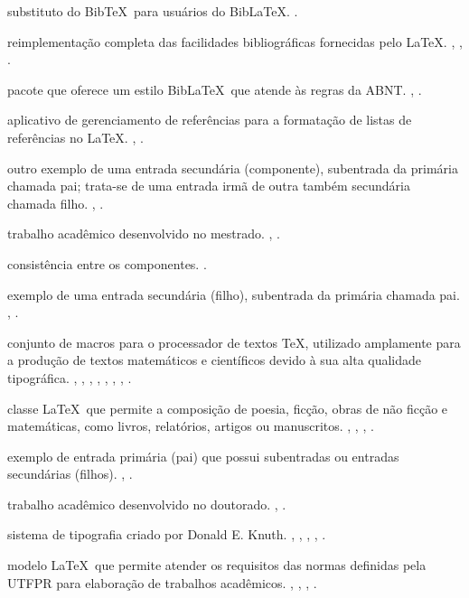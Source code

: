 
\begin{Glossary}%
\item[biber] substituto do Bib\TeX\ para usuários do Bib\LaTeX.
  .
\item[Bib\LaTeX] reimplementação completa das facilidades bibliográficas fornecidas pelo \LaTeX.
  , , .
\item[Bib\LaTeX-abnt] pacote que oferece um estilo Bib\LaTeX\ que atende às regras da ABNT\@.
  , .
\item[Bib\TeX] aplicativo de gerenciamento de referências para a formatação de listas de referências no \LaTeX.
  , .
\glossaryspace%
\item[componente] outro exemplo de uma entrada secundária (componente), subentrada da primária chamada pai; trata-se de uma entrada irmã de outra também secundária chamada filho.
  , .
\glossaryspace%
\item[dissertação] trabalho acadêmico desenvolvido no mestrado.
  , .
\glossaryspace%
\item[equilíbrio da configuração] consistência entre os componentes.
  .
\glossaryspace%
\item[filho] exemplo de uma entrada secundária (filho), subentrada da primária chamada pai.
  , .
\glossaryspace%
\item[\LaTeX] conjunto de macros para o processador de textos \TeX, utilizado amplamente para a produção de textos matemáticos e científicos devido à sua alta qualidade tipográfica.
  , , , , , , , .
\glossaryspace%
\item[memoir] classe \LaTeX\ que permite a composição de poesia, ficção, obras de não ficção e matemáticas, como livros, relatórios, artigos ou manuscritos.
  , , , .
\glossaryspace%
\item[pai] exemplo de entrada primária (pai) que possui subentradas ou entradas secundárias (filhos).
  , .
\glossaryspace%
\item[tese] trabalho acadêmico desenvolvido no doutorado.
  , .
\item[\TeX] sistema de tipografia criado por Donald E. Knuth.
  , , , , .
\glossaryspace%
\item[\UTFPR-Thesis] modelo \LaTeX\ que permite atender os requisitos das normas definidas pela UTFPR para elaboração de trabalhos acadêmicos.
  , , , .
\end{Glossary}
